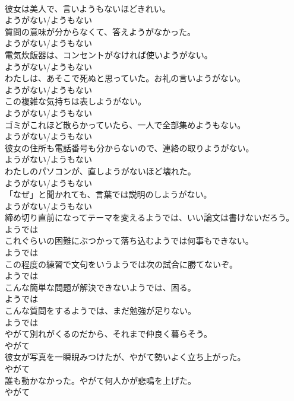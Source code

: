 \documentclass[8pt]{extreport}
\begin{document}
\begin{CJK}{UTF8}{min}
\\	彼女は美人で、言いようもないほどきれい。	
\\	ようがない/ようもない
\\	質問の意味が分からなくて、答えようがなかった。	
\\	ようがない/ようもない
\\	電気炊飯器は、コンセントがなければ使いようがない。	
\\	ようがない/ようもない
\\	わたしは、あそこで死ぬと思っていた。お礼の言いようがない。	
\\	ようがない/ようもない
\\	この複雑な気持ちは表しようがない。	
\\	ようがない/ようもない
\\	ゴミがこれほど散らかっていたら、一人で全部集めようもない。	
\\	ようがない/ようもない
\\	彼女の住所も電話番号も分からないので、連絡の取りようがない。	
\\	ようがない/ようもない
\\	わたしのパソコンが、直しようがないほど壊れた。	
\\	ようがない/ようもない
\\	「なぜ」と聞かれても、言葉では説明のしようがない。	
\\	ようがない/ようもない
\\	締め切り直前になってテーマを変えるようでは、いい論文は書けないだろう。	
\\	ようでは
\\	これぐらいの困難にぶつかって落ち込むようでは何事もできない。	
\\	ようでは
\\	この程度の練習で文句をいうようでは次の試合に勝てないぞ。	
\\	ようでは
\\	こんな簡単な問題が解決できないようでは、困る。	
\\	ようでは
\\	こんな質問をするようでは、まだ勉強が足りない。	
\\	ようでは
\\	やがて別れがくるのだから、それまで仲良く暮らそう。	
\\	やがて
\\	彼女が写真を一瞬睨みつけたが、やがて勢いよく立ち上がった。	
\\	やがて
\\	誰も動かなかった。やがて何人かが悲鳴を上げた。	
\\	やがて

\end{CJK}
\end{document}
